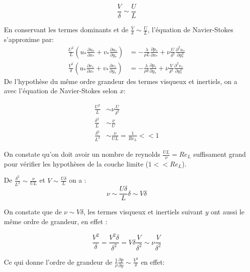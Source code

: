 \documentclass[french]{article}
\begin{document}
\begin{equation*}
	\frac{V}{\delta} \sim \frac{U}{L}
\end{equation*}

En conservant les termes dominants et de $\frac{V}{\delta} \sim \frac{U}{L}$, l'équation de Navier-Stokes s'approxime par:
\begin{align*}
	\frac{U^{2}}{L}
	\left(
	u_{*}\frac{\partial u_{*}}{\partial x_{*}} + 
	v_{*}\frac{\partial u_{*}}{\partial y_{*}} 
	\right)
	&= - \frac{\lambda}{\rho L}
	\frac{\partial p_{*}}{\partial  x_{*}} +
	\nu  \frac{U}{\delta^{2}}
	\frac{\partial^{2} u_{*}}{\partial  y_{*}^{2}} \\
	\frac{V^{2}}{\delta}
	\left(
	u_{*}\frac{\partial v_{*}}{\partial x_{*}} + 
	v_{*}\frac{\partial v_{*}}{\partial y_{*}} 
	\right)
	&= - \frac{\lambda}{\rho\delta}
	\frac{\partial p_{*}}{\partial  y_{*}} +
	\nu\frac{V}{\delta^{2}}
	\frac{\partial^{2} v_{*}}{\partial  y_{*}^{2}} 
\end{align*}
De l'hypothèse du même ordre grandeur des termes visqueux et inertiels, on a avec l'équation de Navier-Stokes selon $x$:

\begin{align*}
	\frac{U^{2}}{L} &\sim 
	\nu\frac{U}{\delta^{2}} \\
	\frac{\delta^{2}}{L} &\sim 
	\frac{\nu}{U}\\
	\frac{\delta^{2}}{L^{2}} &\sim 
	\frac{\nu}{UL} = \frac{1}{Re_{L}} << 1
\end{align*}

On constate qu'on doit avoir un nombre de reynolds $\frac{UL}{\nu} = Re_{L}$ suffisament grand pour vérifier les hypothèses de la couche limite ($1 << Re_{L}$).

De $ \frac{\delta^{2}}{L^{2}} \sim \frac{\nu}{UL} $  
et $ V \sim \frac{U\delta}{L}$ on a :
\begin{equation*}
	\nu \sim \frac{U\delta}{L}\delta \sim V\delta
\end{equation*}

On constate que de $\nu \sim V\delta$, les termes visqueux et inertiels suivant $y$ ont aussi le même ordre de grandeur, en effet : 

\begin{equation*}
	\frac{V^{2}}{\delta} =
	\frac{V^{2}\delta}{\delta ^ 2} =
	V\delta \frac{V}{\delta^{2}} \sim \nu \frac{V}{\delta^{2}}
\end{equation*}

Ce qui donne l'ordre de grandeur de $\frac{1}{\rho}\frac{\partial p}{\partial y} \sim \frac{V^{2}}{\delta}$ en effet:
\end{document}
